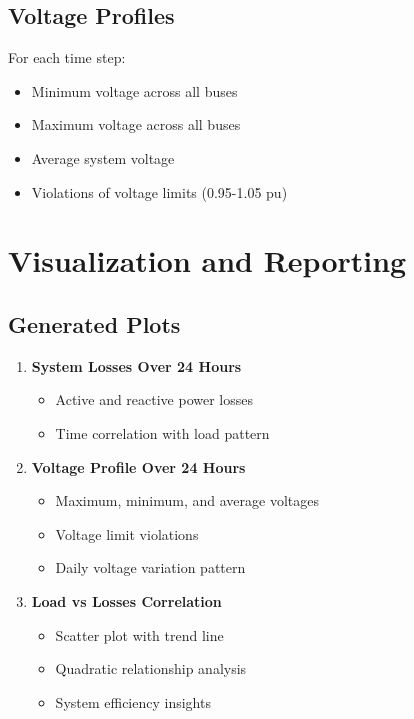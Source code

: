 \documentclass[11pt]{article}
\begin{document}
\subsection{Voltage Profiles}
For each time step:
\begin{itemize}
    \item Minimum voltage across all buses
    \item Maximum voltage across all buses
    \item Average system voltage
    \item Violations of voltage limits (0.95-1.05 pu)
\end{itemize}

\section{Visualization and Reporting}

\subsection{Generated Plots}
\begin{enumerate}
    \item \textbf{System Losses Over 24 Hours}
        \begin{itemize}
            \item Active and reactive power losses
            \item Time correlation with load pattern
        \end{itemize}
    
    \item \textbf{Voltage Profile Over 24 Hours}
        \begin{itemize}
            \item Maximum, minimum, and average voltages
            \item Voltage limit violations
            \item Daily voltage variation pattern
        \end{itemize}
    
    \item \textbf{Load vs Losses Correlation}
        \begin{itemize}
            \item Scatter plot with trend line
            \item Quadratic relationship analysis
            \item System efficiency insights
        \end{itemize}
\end{enumerate}
\end{document}
